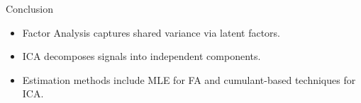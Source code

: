 \documentclass[11pt,handout,aspectratio=169]{beamer}
\begin{document}
\begin{frame}{Conclusion}
    \begin{itemize}
        \item Factor Analysis captures shared variance via latent factors.
        \item ICA decomposes signals into independent components.
        \item Estimation methods include MLE for FA and cumulant-based techniques for ICA.
    \end{itemize}
\end{frame}
\end{document}
